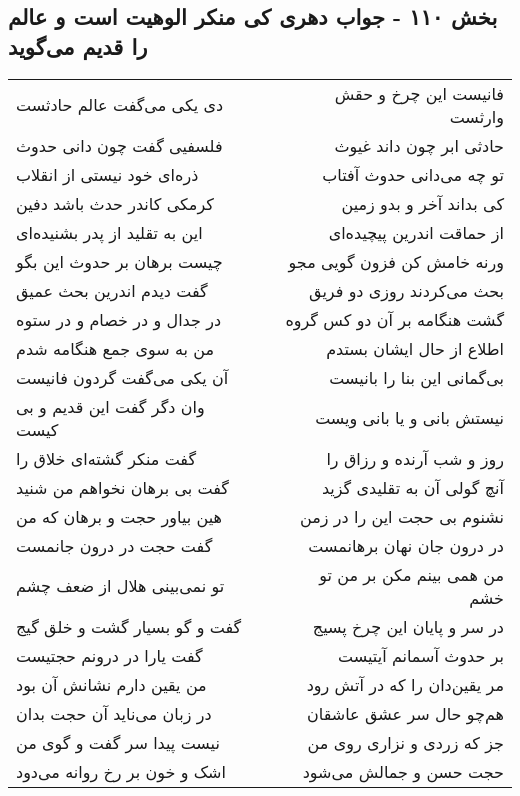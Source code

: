 \begin{center}
\section*{بخش ۱۱۰ - جواب دهری کی منکر الوهیت است و عالم را قدیم می‌گوید}
\label{sec:sh110}
\begin{longtable}{l p{0.5cm} r}
دی یکی می‌گفت عالم حادثست
&&
فانیست این چرخ و حقش وارثست
\\
فلسفیی گفت چون دانی حدوث
&&
حادثی ابر چون داند غیوث
\\
ذره‌ای خود نیستی از انقلاب
&&
تو چه می‌دانی حدوث آفتاب
\\
کرمکی کاندر حدث باشد دفین
&&
کی بداند آخر و بدو زمین
\\
این به تقلید از پدر بشنیده‌ای
&&
از حماقت اندرین پیچیده‌ای
\\
چیست برهان بر حدوث این بگو
&&
ورنه خامش کن فزون گویی مجو
\\
گفت دیدم اندرین بحث عمیق
&&
بحث می‌کردند روزی دو فریق
\\
در جدال و در خصام و در ستوه
&&
گشت هنگامه بر آن دو کس گروه
\\
من به سوی جمع هنگامه شدم
&&
اطلاع از حال ایشان بستدم
\\
آن یکی می‌گفت گردون فانیست
&&
بی‌گمانی این بنا را بانیست
\\
وان دگر گفت این قدیم و بی کیست
&&
نیستش بانی و یا بانی ویست
\\
گفت منکر گشته‌ای خلاق را
&&
روز و شب آرنده و رزاق را
\\
گفت بی برهان نخواهم من شنید
&&
آنچ گولی آن به تقلیدی گزید
\\
هین بیاور حجت و برهان که من
&&
نشنوم بی حجت این را در زمن
\\
گفت حجت در درون جانمست
&&
در درون جان نهان برهانمست
\\
تو نمی‌بینی هلال از ضعف چشم
&&
من همی بینم مکن بر من تو خشم
\\
گفت و گو بسیار گشت و خلق گیج
&&
در سر و پایان این چرخ پسیج
\\
گفت یارا در درونم حجتیست
&&
بر حدوث آسمانم آیتیست
\\
من یقین دارم نشانش آن بود
&&
مر یقین‌دان را که در آتش رود
\\
در زبان می‌ناید آن حجت بدان
&&
هم‌چو حال سر عشق عاشقان
\\
نیست پیدا سر گفت و گوی من
&&
جز که زردی و نزاری روی من
\\
اشک و خون بر رخ روانه می‌دود
&&
حجت حسن و جمالش می‌شود
\\

\end{longtable}
\end{center}

